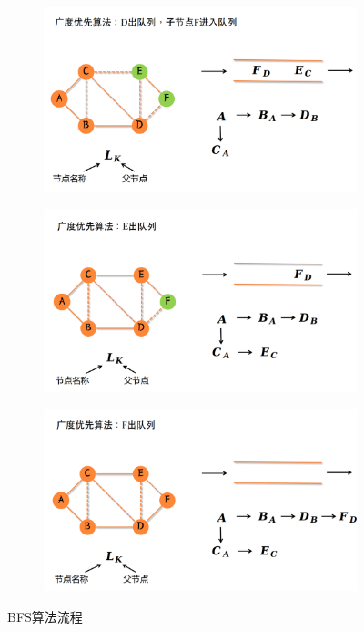 \documentclass[../main.tex]{subfiles}
\begin{document}
\begin{enumerate}
\begin{figure}[H]
\begin{subfigure}[b]{0.32\textwidth}
            \end{subfigure}
            \vspace{0.5em}
            \begin{subfigure}[b]{0.32\textwidth}
                \includegraphics[width=\textwidth]{images/BFS/4.png}
            \end{subfigure}
            \begin{subfigure}[b]{0.32\textwidth}
                \includegraphics[width=\textwidth]{images/BFS/5.png}
            \end{subfigure}
            \begin{subfigure}[b]{0.32\textwidth}
                \includegraphics[width=\textwidth]{images/BFS/6.png}
            \end{subfigure}
            \caption{BFS算法流程}
        \end{figure}
        

\end{enumerate}
\end{document}
